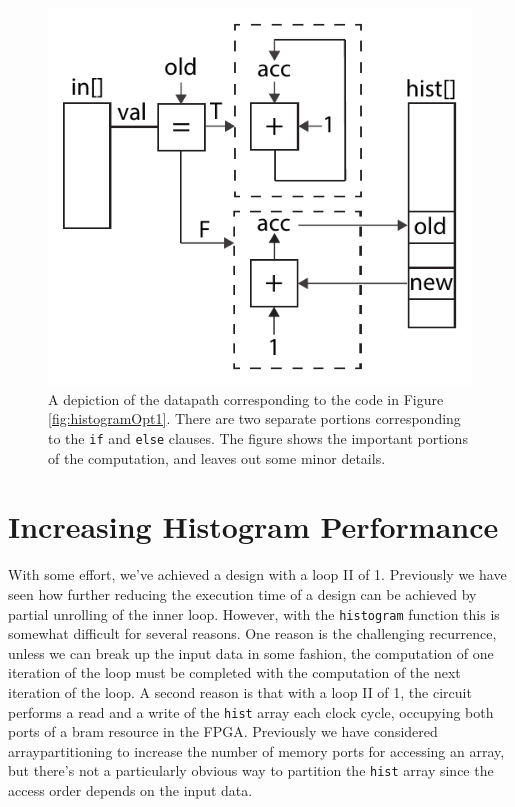 \begin{figure}
\centering
\includegraphics[width=  .6\textwidth]{images/architectures_histogram_restructured}
\caption{ A depiction of the datapath corresponding to the code in Figure \ref{fig:histogramOpt1}. There are two separate portions corresponding to the \lstinline{if} and \lstinline{else} clauses. The figure shows the important portions of the computation, and leaves out some minor details. }
\label{fig:architecture_histogram_restructured}
\end{figure}

\section{Increasing Histogram Performance}

With some effort, we've achieved a design with a loop II of 1.  Previously we have seen how further reducing the execution time of a design can be achieved by partial unrolling of the inner loop.  However, with the \lstinline|histogram| function this is somewhat difficult for several reasons.  One reason is the challenging recurrence, unless we can break up the input data in some fashion, the computation of one iteration of the loop must be completed with the computation of the next iteration of the loop. A second reason is that with a loop II of 1, the circuit performs a read and a write of the \lstinline|hist| array each clock cycle, occupying both ports of a \gls{bram} resource in the FPGA.   Previously we have considered \gls{arraypartitioning} to increase the number of memory ports for accessing an array, but there's not a particularly obvious way to partition the \lstinline|hist| array since the access order depends on the input data.

